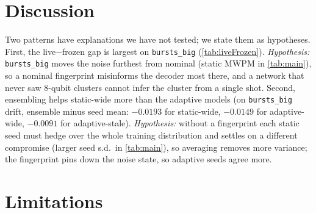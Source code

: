 \documentclass[11pt,a4paper]{article}
\newcommand{\reg}[1]{\texttt{#1}}
\begin{document}
\section{Discussion}\label{sec:discussion}

Two patterns have explanations we have not tested; we state them as hypotheses. First, the live$-$frozen gap is
largest on \reg{bursts\_big} (\cref{tab:liveFrozen}). \emph{Hypothesis:} \reg{bursts\_big} moves the noise furthest from nominal (static MWPM in \cref{tab:main}), so a nominal fingerprint misinforms the decoder most there, and a network that
never saw 8-qubit clusters cannot infer the cluster from a single shot. Second, ensembling helps static-wide more than
the adaptive models (on \reg{bursts\_big} drift, ensemble minus seed mean: $-0.0193$ for static-wide, $-0.0149$ for
adaptive-wide, $-0.0091$ for adaptive-stale). \emph{Hypothesis:} without a fingerprint each static seed must hedge over
the whole training distribution and settles on a different compromise (larger seed s.d.\ in \cref{tab:main}), so averaging removes more variance; the fingerprint pins down the noise state, so adaptive seeds
agree more.

\section{Limitations}\label{sec:limitations}
\end{document}
